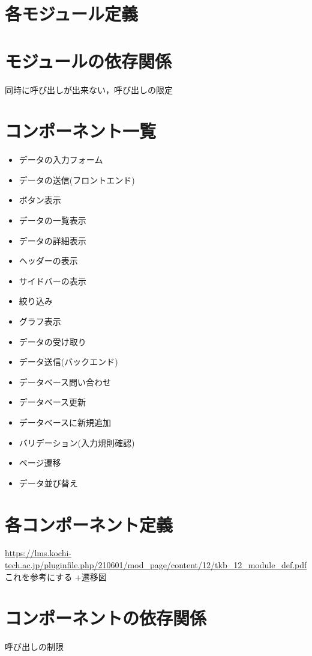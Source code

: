 \documentclass[a4paper, titlepage]{jsarticle}
\begin{document}
\section{各モジュール定義}
\section{モジュールの依存関係}
同時に呼び出しが出来ない，呼び出しの限定


\section{コンポーネント一覧}
\begin{itemize}
  \item データの入力フォーム
  \item データの送信(フロントエンド)
  \item ボタン表示
  \item データの一覧表示
  \item データの詳細表示
  \item ヘッダーの表示
  \item サイドバーの表示
  \item 絞り込み
  \item グラフ表示
  \item データの受け取り
  \item データ送信(バックエンド)
  \item データベース問い合わせ
  \item データベース更新
  \item データベースに新規追加
  \item バリデーション(入力規則確認)
  \item ページ遷移
  \item データ並び替え
\end{itemize}
\section{各コンポーネント定義}
\url{https://lms.kochi-tech.ac.jp/pluginfile.php/210601/mod_page/content/12/tkb_12_module_def.pdf}これを参考にする
+遷移図
\section{コンポーネントの依存関係}
呼び出しの制限


\end{document}
